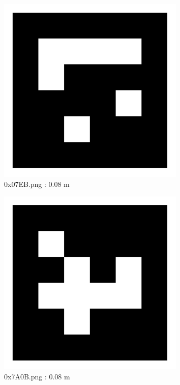 \documentclass[11pt,a4,BCOR=0cm]{scrartcl}
\begin{document}
\begin{figure}
  \centering
    \includegraphics[width=8.955cm]{0x07EB.pdf}
    \caption{0x07EB.png : 0.08 m}
    \label{fig:0x07EB.pdf}
  
\end{figure} 

\clearpage

\begin{figure}
  \centering
    \includegraphics[width=8.955cm]{0x7A0B.pdf}
    \caption{0x7A0B.png : 0.08 m}
    \label{fig:0x7A0B.pdf}
  
\end{figure} 
\end{document}
